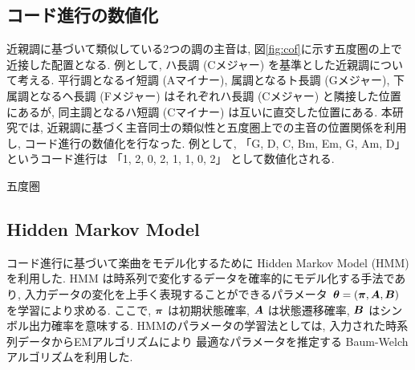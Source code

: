 \documentclass{jpreprint}
\def\vector#1{\mbox{\boldmath{$#1$}}}
\begin{document}
\begin{multicols}{2}
\subsection{コード進行の数値化}
近親調に基づいて類似している2つの調の主音は,
図\ref{fig:cof}に示す五度圏の上で近接した配置となる.
例として, ハ長調 (Cメジャー) を基準とした近親調について考える.
平行調となるイ短調 (Aマイナー), 
属調となるト長調 (Gメジャー),
下属調となるヘ長調 (Fメジャー)
はそれぞれハ長調 (Cメジャー) と隣接した位置にあるが,
同主調となるハ短調 (Cマイナー) は互いに直交した位置にある.
本研究では, 近親調に基づく主音同士の類似性と五度圏上での主音の位置関係を利用し,
コード進行の数値化を行なった.
例として,
「G, D, C, Bm, Em, G, Am, D」
というコード進行は
「1, 2, 0, 2, 1, 1, 0, 2」
として数値化される.

\begin{figurehere}
  \begin{center}
  \caption{五度圏}
  \label{fig:cof}
  \end{center}
\end{figurehere}

\subsection{Hidden Markov Model}
コード進行に基づいて楽曲をモデル化するために
Hidden Markov Model (HMM)\cite{HMM} を利用した.
HMM は時系列で変化するデータを確率的にモデル化する手法であり,
入力データの変化を上手く表現することができるパラメータ
$\vector{\theta} = (\vector{\pi}, \vector{A}, \vector{B})$
を学習により求める.
ここで, 
$\vector{\pi}$ は初期状態確率,
$\vector{A}$ は状態遷移確率,
$\vector{B}$ はシンボル出力確率を意味する.
HMMのパラメータの学習法としては,
入力された時系列データからEMアルゴリズムにより
最適なパラメータを推定する
Baum-Welch アルゴリズム\cite{BWA}を利用した.


\end{multicols}
\end{document}
